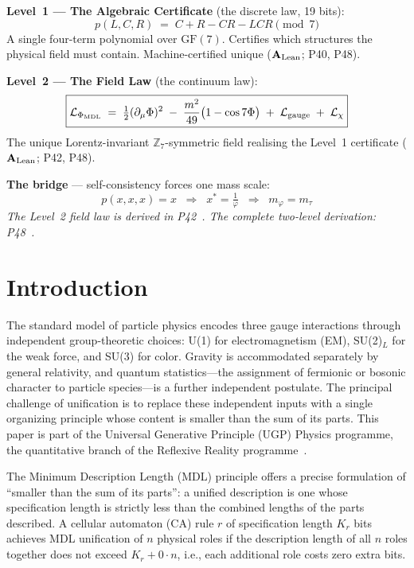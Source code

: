 \documentclass[11pt]{article}
\theoremstyle{remark}
\newcommand{\PHIMDL}{\Phi_{\mathrm{MDL}}}
\newcommand{\ZS}{\mathbb{Z}_7}
\newcommand{\CatAL}{\ensuremath{\textbf{A}_{\rm Lean}}}
\begin{document}
\begin{tcolorbox}[colback=green!4,colframe=green!55!black,
  title={\textbf{The Two Laws: One Framework, Two Levels}},
  fonttitle=\small\bfseries, left=8pt, right=8pt, top=6pt, bottom=6pt,
  breakable]
\small

\medskip\noindent
\textbf{Level~1 --- The Algebraic Certificate} (the discrete law, 19 bits):
\[
  \boxed{p(L,C,R) \;=\; C + R - CR - LCR \pmod{7}}
\]
A single four-term polynomial over $\mathrm{GF}(7)$.
Certifies which structures the physical field must contain.
Machine-certified unique (\CatAL; P40, P48).

\medskip\noindent
\textbf{Level~2 --- The Field Law} (the continuum law):
\[
  \boxed{\mathcal{L}_{\PHIMDL} \;=\; \tfrac{1}{2}(\partial_\mu\Phi)^2
    \;-\;\frac{m^2}{49}\bigl(1 - \cos 7\Phi\bigr)
    \;+\;\mathcal{L}_{\rm gauge}\;+\;\mathcal{L}_\chi}
\]
The unique Lorentz-invariant $\ZS$-symmetric field realising the
Level~1 certificate (\CatAL; P42, P48).

\medskip\noindent
\textbf{The bridge} --- self-consistency forces one mass scale:
\[
  \boxed{p(x,x,x) = x \;\;\Longrightarrow\;\; x^* = \tfrac{1}{\varphi}
    \;\;\Longrightarrow\;\; m_\varphi = m_\tau}
\]
\emph{The Level~2 field law is derived in P42~\cite{SpivackPhiMDLField}. The complete two-level derivation: P48~\cite{SpivackGTECompleteFramework}.}
\end{tcolorbox}

\section{Introduction}
\label{sec:intro}

The standard model of particle physics encodes three gauge interactions through
independent group-theoretic choices: U(1) for electromagnetism (EM), SU(2)$_L$ for the
weak force, and SU(3) for color. Gravity is accommodated separately by general
relativity, and quantum statistics---the assignment of fermionic or bosonic character
to particle species---is a further independent postulate. The principal challenge of
unification is to replace these independent inputs with a single organizing
principle whose content is smaller than the sum of its parts.
This paper is part of the Universal Generative Principle (UGP) Physics programme, the quantitative branch of the
Reflexive Reality programme~\cite{SpivackResearchProgrammes}.

The Minimum Description Length (MDL) principle offers a precise formulation of
``smaller than the sum of its parts'': a unified description is one whose
specification length is strictly less than the combined lengths of the parts
described. A cellular automaton (CA) rule $r$ of specification length $K_r$ bits
achieves MDL unification of $n$ physical roles if the description length of all
$n$ roles together does not exceed $K_r + 0 \cdot n$, i.e., each additional role
costs zero extra bits.
\end{document}
